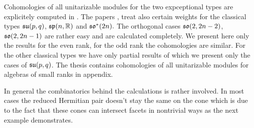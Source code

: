 \documentclass[12pt,a4paper,final]{report}
\begin{document}
Cohomologies of all unitarizable modules for the two expceptional types are explicitely computed in \cite{enright_resolutions_2004-1}. The papers \cite{enright_hilbert_2004}, \cite{enright_resolutions_2004} treat also certain weights for the classical types $\mathfrak{su}(p,q)$, $\mathfrak{sp}(n,\mathbb{R})$ and $\mathfrak{so}^*(2n).$  The orthogonal cases $\mathfrak{so}(2,2n-2)$, $\mathfrak{so}(2,2n-1)$ are rather easy and are calculated completely. We present here only the results for the even rank, for the odd rank the cohomologies are similar. For the other classical types we have only partial results of which we present only the cases of $\mathfrak{su}(p,q)$. The thesis contains cohomologies of all unitarizable modules for algebras of small ranks in appendix. 

In general the combinatorics behind the calculations is rather involved. In most cases the reduced Hermitian pair doesn't stay the same on the cone which is due to the fact that these cones can intersect facets in nontrivial ways as the next example demonstrates. 
\end{document}
